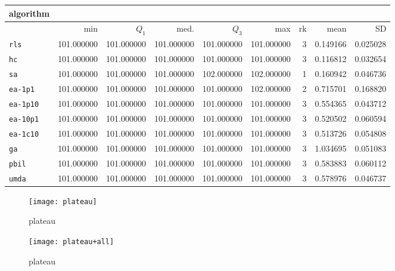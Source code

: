 \begin{center}
\begin{tabular}{@{}l*{5}{>{{}}N{3}{0}}>{{}}N{2}{0}N{1}{3}N{1}{3}@{}}
\toprule
{algorithm} &  &  \\
\midrule
& {min} & {$Q_1$} & {med.} & {$Q_3$} & {max} & {rk} & {mean} & {SD} \\
\midrule
\verb|rls| & {\color{blue}} 101.000000 & {\color{blue}} 101.000000 & {\color{blue}} 101.000000 & 101.000000 & 101.000000 & 3 & 0.149166 & 0.025028 \\
 \verb|hc| & {\color{blue}} 101.000000 & {\color{blue}} 101.000000 & {\color{blue}} 101.000000 & 101.000000 & 101.000000 & 3 & 0.116812 & 0.032654 \\
 \verb|sa| & {\color{blue}} 101.000000 & {\color{blue}} 101.000000 & {\color{blue}} 101.000000 & {\color{blue}} 102.000000 & {\color{blue}} 102.000000 & 1 & 0.160942 & 0.046736 \\
 \verb|ea-1p1| & {\color{blue}} 101.000000 & {\color{blue}} 101.000000 & {\color{blue}} 101.000000 & 101.000000 & {\color{blue}} 102.000000 & 2 & 0.715701 & 0.168820 \\
 \verb|ea-1p10| & {\color{blue}} 101.000000 & {\color{blue}} 101.000000 & {\color{blue}} 101.000000 & 101.000000 & 101.000000 & 3 & 0.554365 & 0.043712 \\
 \verb|ea-10p1| & {\color{blue}} 101.000000 & {\color{blue}} 101.000000 & {\color{blue}} 101.000000 & 101.000000 & 101.000000 & 3 & 0.520502 & 0.060594 \\
 \verb|ea-1c10| & {\color{blue}} 101.000000 & {\color{blue}} 101.000000 & {\color{blue}} 101.000000 & 101.000000 & 101.000000 & 3 & 0.513726 & 0.054808 \\
 \verb|ga| & {\color{blue}} 101.000000 & {\color{blue}} 101.000000 & {\color{blue}} 101.000000 & 101.000000 & 101.000000 & 3 & 1.034695 & 0.051083 \\
 \verb|pbil| & {\color{blue}} 101.000000 & {\color{blue}} 101.000000 & {\color{blue}} 101.000000 & 101.000000 & 101.000000 & 3 & 0.583883 & 0.060112 \\
 \verb|umda| & {\color{blue}} 101.000000 & {\color{blue}} 101.000000 & {\color{blue}} 101.000000 & 101.000000 & 101.000000 & 3 & 0.578976 & 0.046737 \\
 \bottomrule
\end{tabular}
\end{center}

\begin{center}
\begin{figure}[h]
\centering
\texttt{[image: plateau]}
\caption{plateau}
\end{figure}
\end{center}

\begin{center}
\begin{figure}[h]
\centering
\texttt{[image: plateau+all]}
\caption{plateau}
\end{figure}
\end{center}

